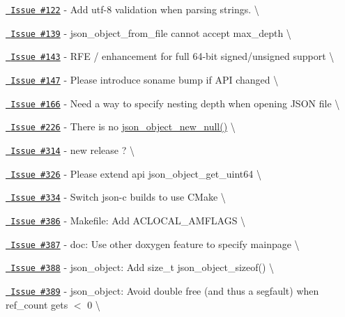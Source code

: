 \begin{DoxyItemize}
\item \href{https://github.com/json-c/json-c/issues/122}{\texttt{ Issue \#122}} -\/ Add utf-\/8 validation when parsing strings. \textbackslash{}
\item \href{https://github.com/json-c/json-c/issues/139}{\texttt{ Issue \#139}} -\/ json\+\_\+object\+\_\+from\+\_\+file cannot accept max\+\_\+depth \textbackslash{}
\item \href{https://github.com/json-c/json-c/issues/143}{\texttt{ Issue \#143}} -\/ RFE / enhancement for full 64-\/bit signed/unsigned support \textbackslash{}
\item \href{https://github.com/json-c/json-c/issues/147}{\texttt{ Issue \#147}} -\/ Please introduce soname bump if API changed \textbackslash{}
\item \href{https://github.com/json-c/json-c/issues/166}{\texttt{ Issue \#166}} -\/ Need a way to specify nesting depth when opening JSON file \textbackslash{}
\item \href{https://github.com/json-c/json-c/issues/226}{\texttt{ Issue \#226}} -\/ There is no \mbox{\hyperlink{json__object_8h_a29e23b5be729c679960242b3b81bcde0}{json\+\_\+object\+\_\+new\+\_\+null()}} \textbackslash{}
\item \href{https://github.com/json-c/json-c/issues/314}{\texttt{ Issue \#314}} -\/ new release ? \textbackslash{}
\item \href{https://github.com/json-c/json-c/issues/326}{\texttt{ Issue \#326}} -\/ Please extend api json\+\_\+object\+\_\+get\+\_\+uint64 \textbackslash{}
\item \href{https://github.com/json-c/json-c/issues/334}{\texttt{ Issue \#334}} -\/ Switch json-\/c builds to use CMake \textbackslash{}
\item \href{https://github.com/json-c/json-c/issues/386}{\texttt{ Issue \#386}} -\/ Makefile\+: Add ACLOCAL\+\_\+\+AMFLAGS \textbackslash{}
\item \href{https://github.com/json-c/json-c/issues/387}{\texttt{ Issue \#387}} -\/ doc\+: Use other doxygen feature to specify mainpage \textbackslash{}
\item \href{https://github.com/json-c/json-c/issues/388}{\texttt{ Issue \#388}} -\/ json\+\_\+object\+: Add size\+\_\+t json\+\_\+object\+\_\+sizeof() \textbackslash{}
\item \href{https://github.com/json-c/json-c/issues/389}{\texttt{ Issue \#389}} -\/ json\+\_\+object\+: Avoid double free (and thus a segfault) when ref\+\_\+count gets $<$ 0 \textbackslash{}

\end{DoxyItemize}
